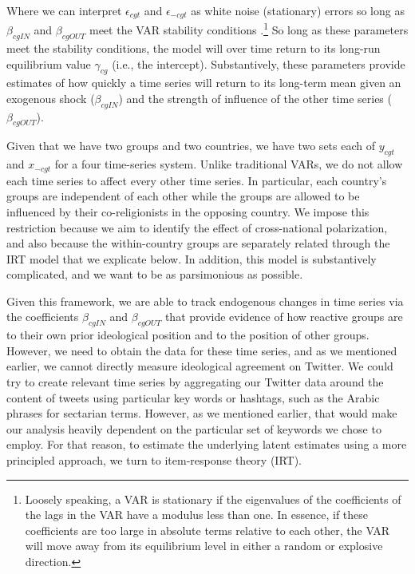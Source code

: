 \documentclass[12pt]{article}
\begin{document}
Where we can interpret $\epsilon_{cgt}$ and $\epsilon_{-cgt}$ as white noise (stationary) errors so long as $\beta_{cgIN}$ and $\beta_{cgOUT}$ meet the VAR stability conditions \parencite[386-387]{zivot2006}.\footnote{Loosely speaking, a VAR is stationary if the eigenvalues of the coefficients of the lags in the VAR have a modulus less than one. In essence, if these coefficients are too large in absolute terms relative to each other, the VAR will move away from its equilibrium level in either a random or explosive direction.} So long as these parameters meet the stability conditions, the model will over time return to its long-run equilibrium value $\gamma_{cg}$ (i.e., the intercept). Substantively, these parameters provide estimates of how quickly a time series will return to its long-term mean given an exogenous shock ($\beta_{cgIN}$) and the strength of influence of the other time series ($\beta_{cgOUT}$).

Given that we have two groups and two countries, we have two sets each of $y_{cgt}$ and $x_{-cgt}$ for a four time-series system. Unlike traditional VARs, we do not allow each time series to affect every other time series. In particular, each country's groups are independent of each other while the groups are allowed to be influenced by their co-religionists in the opposing country. We impose this restriction because we aim to identify the effect of cross-national polarization, and also because the within-country groups are separately related through the IRT model that we explicate below. In addition, this model is substantively complicated, and we want to be as parsimonious as possible.

Given this framework, we are able to track endogenous changes in time series via the coefficients $\beta_{cgIN}$ and $\beta_{cgOUT}$ that provide evidence of how reactive groups are to their own prior ideological position and to the position of other groups. However, we need to obtain the data for these time series, and as we mentioned earlier, we cannot directly measure ideological agreement on Twitter. We could try to create relevant time series by aggregating our Twitter data around the content of tweets using particular key words or hashtags, such as the Arabic phrases for sectarian terms. However, as we mentioned earlier, that would make our analysis heavily dependent on the particular set of keywords we chose to employ. For that reason, to estimate the underlying latent estimates using a more principled approach, we turn to item-response theory (IRT).
\end{document}
